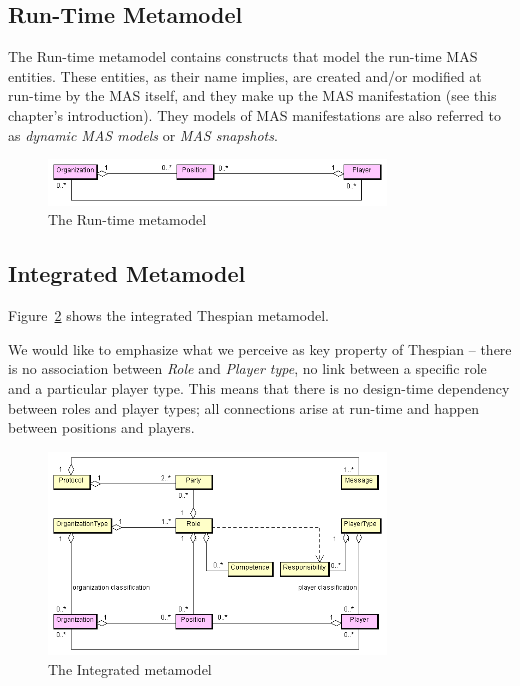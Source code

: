 \subsection{Run-Time Metamodel}

The Run-time metamodel contains constructs that model the run-time MAS entities.
These entities, as their name implies, are created and/or modified at run-time by the MAS itself, and they make up the MAS manifestation (see this chapter's introduction).
They models of MAS manifestations are also referred to as \textit{dynamic MAS models} or \textit{MAS snapshots}.

\begin{figure}[ht]
	\centering
	\includegraphics[width=0.8\textwidth]{images/thespian/run-time-metamodel.png}
	\caption{The Run-time metamodel}
	\label{figure:thespian-dynamic-metamodel}
\end{figure}

\subsection{Integrated Metamodel}

Figure~\ref{figure:thespian-integrated-metamodel} shows the integrated Thespian metamodel.

We would like to emphasize what we perceive as key property of Thespian -- there is no association between \textit{Role} and \textit{Player type}, no link between a specific role and a particular player type.
This means that there is no design-time dependency between roles and player types; all connections arise at run-time and happen between positions and players.

\begin{figure}[ht]
	\centering
	\includegraphics[width=0.8\textwidth]{images/thespian/thespian-metamodel.png}
	\caption{The Integrated metamodel}
	\label{figure:thespian-integrated-metamodel}
\end{figure}